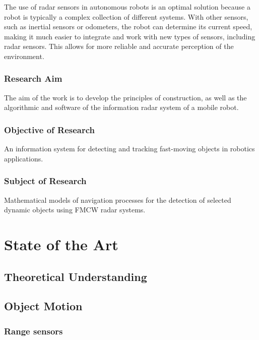 The use of radar sensors in autonomous robots is an optimal solution because a robot is typically a complex collection of different systems. With other sensors, such as inertial sensors or odometers, the robot can determine its current speed, making it much easier to integrate and work with new types of sensors, including radar sensors. This allows for more reliable and accurate perception of the environment.

\subsubsection{Research Aim}
The aim of the work is to develop the principles of construction, as well as the algorithmic and software of the information radar system of a mobile robot.


\subsubsection{Objective of Research}
An information system for detecting and tracking fast-moving objects in robotics applications.
\subsubsection{Subject of Research}
Mathematical models of navigation processes for the detection of selected dynamic objects using FMCW radar systems.
\section{State of the Art}
\subsection{Theoretical Understanding}


\subsection{Object Motion}

\subsubsection{Range sensors}
